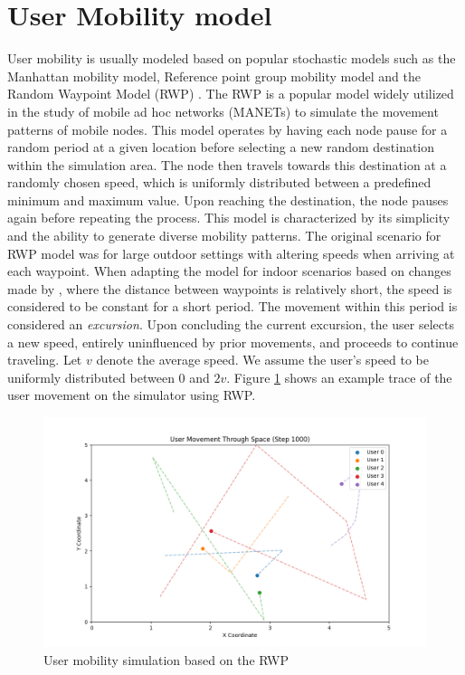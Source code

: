 \section{User Mobility model}
User mobility is usually modeled based on popular stochastic models such as the Manhattan mobility model, Reference point group mobility model \cite{kahn_experimental_1995} and the Random Waypoint Model (RWP) \cite{imielinski_dynamic_1996}. The RWP is a popular model widely utilized in the study of mobile ad hoc networks (MANETs) to simulate the movement patterns of mobile nodes. This model operates by having each node pause for a random period at a given location before selecting a new random destination within the simulation area. The node then travels towards this destination at a randomly chosen speed, which is uniformly distributed between a predefined minimum and maximum value. Upon reaching the destination, the node pauses again before repeating the process. This model is characterized by its simplicity and the ability to generate diverse mobility patterns. The original scenario for RWP model was for large outdoor settings with altering speeds when arriving at each waypoint. When adapting the model for indoor scenarios based on changes made by \cite{wu_smart_2020}, where the distance between waypoints is relatively short, the speed is considered to be constant for a short period. The movement within this period is considered an \textit{excursion}. Upon concluding the current excursion, the user selects a new speed, entirely uninfluenced by prior movements, and proceeds to continue traveling. Let $v$ denote the average speed. We assume the user's speed to be uniformly distributed between $0$ and $2v$. Figure \ref{fig:mod-user-mob} shows an example trace of the user movement on the simulator using RWP.
\begin{figure}
    \centering
    \includegraphics[width=1\linewidth]{Figures/mobility-plot-2025-04-28-15-30-46.png}
    \caption{User mobility simulation based on the RWP}
    \label{fig:mod-user-mob}
\end{figure}
